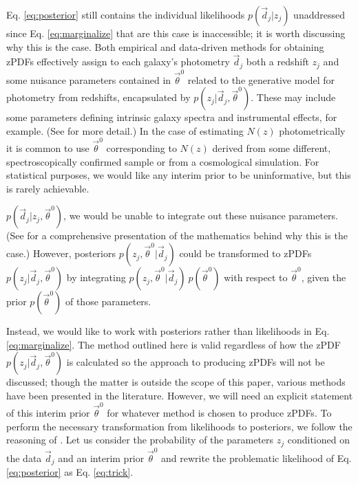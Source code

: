 \documentclass[preprint]{aastex}
\begin{document}
Eq. \ref{eq:posterior} still contains the individual likelihoods 
$p(\vec{d}_{j}|z_{j})$ unaddressed since Eq. \ref{eq:marginalize} that are this 
case is inaccessible; it is worth discussing why this is the case.  Both 
empirical and data-driven methods for obtaining zPDFs effectively assign to 
each galaxy's photometry $\vec{d}_{j}$ both a redshift $z_{j}$ and some 
nuisance parameters contained in $\vec{\theta}^{0}$ related to the generative 
model for photometry from redshifts, encapsulated by 
$p(z_{j}|\vec{d}_{j},\vec{\theta}^{0})$.  These may include some parameters 
defining intrinsic galaxy spectra and instrumental effects, for example. (See 
\citet{Benitez2000} for more detail.)  In the case of estimating $N(z)$ 
photometrically it is common to use $\vec{\theta}^{0}$ corresponding to $N(z)$ 
derived from some different, spectroscopically confirmed sample or from a 
cosmological simulation.  For statistical purposes, we would like any interim 
prior to be uninformative, but this is rarely achievable.

$p(\vec{d}_{j}|z_{j},\vec{\theta}^{0})$, we would be unable to integrate out 
these nuisance parameters.  (See \citet{Hogg2012} for a comprehensive 
presentation of the mathematics behind why this is the case.)  However, 
posteriors $p(z_{j},\vec{\theta}^{0}|\vec{d}_{j})$ could be transformed to 
zPDFs $p(z_{j}|\vec{d}_{j},\vec{\theta}^{0})$ by integrating 
$p(z_{j},\vec{\theta}^{0}|\vec{d}_{j})\ p(\vec{\theta}^{0})$ with respect to 
$\vec{\theta}^{0}$, given the prior  $p(\vec{\theta}^{0})$ of those parameters. 
 

Instead, we would like to work with posteriors rather than likelihoods in Eq. 
\ref{eq:marginalize}.  The method outlined here is valid regardless of how the 
zPDF $p(z_{j}|\vec{d}_{j},\vec{\theta}^{0})$ is calculated so the approach to 
producing zPDFs will not be discussed; though the matter is outside the scope 
of this paper, various methods have been presented in the literature. 
\citep{Sheldon2012, Ball2008, CarrascoKind2013, CarrascoKind2014a}  However, we 
will need an explicit statement of this interim prior $\vec{\theta}^{0}$ for 
whatever method is chosen to produce zPDFs.  To perform the necessary 
transformation from likelihoods to posteriors, we follow the reasoning of 
\citet{Marshall2015}.  Let us consider the probability of the parameters 
$z_{j}$ conditioned on the data $\vec{d}_{j}$ and an interim prior 
$\vec{\theta}^{0}$ and rewrite the problematic likelihood of Eq. 
\ref{eq:posterior} as Eq. \ref{eq:trick}.  
\end{document}
